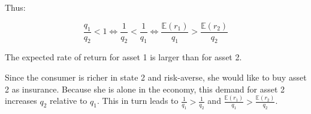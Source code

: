 {{\begin{enumerate}[label=(\alph*)]
{Thus:

$$
\frac{q_{1}}{q_{2}}<1 \Longleftrightarrow \frac{1}{q_{2}}<\frac{1}{q_{1}} \Leftrightarrow \frac{\mathbb{E}\left(r_{1}\right)}{q_{1}}>\frac{\mathbb{E}\left(r_{2}\right)}{q_{2}}
$$

The expected rate of return for asset 1 is larger than for asset 2.

Since the consumer is richer in state 2 and risk-averse, she would like to buy asset 2 as insurance. Because she is alone in the economy, this demand for asset 2 increases $q_{2}$ relative to $q_{1}$. This in turn leads to $\frac{1}{q_{1}}>\frac{1}{q_{2}}$ and $\frac{\mathbb{E}\left(r_{1}\right)}{q_{1}}>\frac{\mathbb{E}\left(r_{2}\right)}{q_{2}}$.
}
\end{enumerate}
}
}